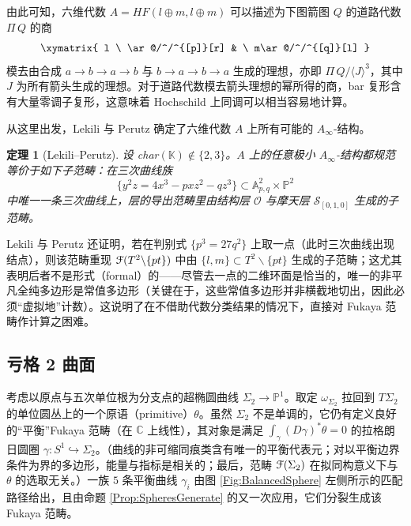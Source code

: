\documentclass[11pt,a4paper]{article}
\numberwithin{equation}{section}
\newtheorem{Theorem}[thm]{定理}
\newcommand{\bZ}{\mathbb{Z}}
\newcommand{\bC}{\mathbb{C}}
\newcommand{\bP}{\mathbb{P}}
\newcommand{\bK}{\mathbb{K}}
\newcommand{\scrF}{\EuScript{F}}
\newcommand{\id}{\mathrm{id}}
\begin{document}

由此可知，六维代数 $A = HF(l \oplus m, l \oplus m)$ 可以描述为下图箭图 $Q$ 的道路代数 $\Pi\,Q$ 的商
\begin{equation*}
\xymatrix{
 l \ \ar@/^/^{[p]}[r] & \ m\ar@/^/^{[q]}[l]
}
\end{equation*}
模去由合成 $a\rightarrow b\rightarrow a \rightarrow b$ 与 $b\rightarrow a \rightarrow b \rightarrow a$ 生成的理想，亦即 $\Pi\,Q / \langle J\rangle^3$，其中 $J$ 为所有箭头生成的理想。对于道路代数模去箭头理想的幂所得的商，bar 复形含有大量零调子复形，这意味着 Hochschild 上同调可以相当容易地计算。

从这里出发，Lekili 与 Perutz \cite{LekiliPerutz} 确定了六维代数 $A$ 上所有可能的 $A_{\infty}$-结构。


\begin{Theorem}[Lekili--Perutz]\label{Thm:LPelliptic}
设 char$(\bK) \not\in \{2,3\}$。$A$ 上的任意极小 $A_{\infty}$-结构都规范等价于如下子范畴：在三次曲线族
\[
\{y^2z = 4x^3 - pxz^2 - qz^3 \} \subset \mathbb{A}^2_{p,q}  \times \bP^2
\]
中唯一一条三次曲线上，层的导出范畴里由结构层 $\mathcal{O}$ 与摩天层 $\mathcal{S}_{[0,1,0]}$ 生成的子范畴。
\end{Theorem}

Lekili 与 Perutz 还证明，若在判别式 $\{p^3 = 27 q^2\}$ 上取一点（此时三次曲线出现结点），则该范畴重现 $\scrF(T^2 \backslash \{pt\})$ 中由 $\{l,m\} \subset T^2\backslash \{pt\}$ 生成的子范畴；这尤其表明后者不是形式（formal）的——尽管去一点的二维环面是恰当的，唯一的非平凡全纯多边形是常值多边形（关键在于，这些常值多边形并非横截地切出，因此必须“虚拟地”计数）。这说明了在不借助代数分类结果的情况下，直接对 Fukaya 范畴作计算之困难。

\subsection{亏格 2 曲面\label{Subsec:genus2}} 考虑以原点与五次单位根为分支点的超椭圆曲线 $\Sigma_2 \rightarrow \bP^1$。取定 $\omega_{\Sigma_2}$ 拉回到 $T\Sigma_2$ 的单位圆丛上的一个原语（primitive）$\theta$。虽然 $\Sigma_2$ 不是单调的，它仍有定义良好的“平衡”Fukaya 范畴（在 $\bC$ 上线性），其对象是满足 $\int_{\gamma} (D\gamma)^*\theta = 0$ 的拉格朗日圆圈 $\gamma: S^1 \hookrightarrow \Sigma_2$。（曲线的非可缩同痕类含有唯一的平衡代表元；对以平衡边界条件为界的多边形，能量与指标是相关的；最后，范畴 $\scrF(\Sigma_2)$ 在拟同构意义下与 $\theta$ 的选取无关。）一族 $5$ 条平衡曲线 $\gamma_i$ 由图 \ref{Fig:BalancedSphere} 左侧所示的匹配路径给出，且由命题 \ref{Prop:SpheresGenerate} 的又一次应用，它们分裂生成该 Fukaya 范畴。
\end{document}
